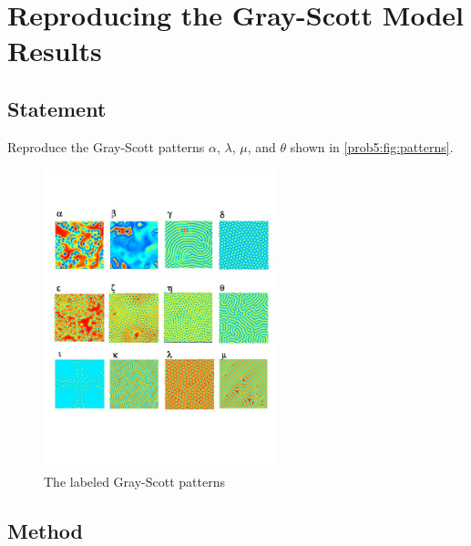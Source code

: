 \section{Reproducing the Gray-Scott Model Results}

\subsection{Statement}
Reproduce the Gray-Scott patterns $\alpha$, $\lambda$, $\mu$, and $\theta$ shown in \autoref{prob5:fig:patterns}.

\begin{figure}[H]
    \centering
    \includegraphics[width=0.6\textwidth]{figures/reactions/patterns.jpg}
    \caption{The labeled Gray-Scott patterns}\label{prob5:fig:patterns}
\end{figure}

\subsection{Method}

